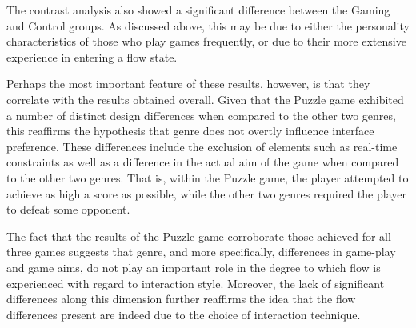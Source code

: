 The contrast analysis also showed a significant difference between the Gaming and Control groups. As discussed above, this may be due to either the personality characteristics of those who play games frequently, or due to their more extensive experience in entering a flow state.

Perhaps the most important feature of these results, however, is that they correlate with the results obtained overall. Given that the Puzzle game exhibited a number of distinct design differences when compared to the other two genres, this reaffirms the hypothesis that genre does not overtly influence interface preference. These differences include the exclusion of elements such as real-time constraints as well as a difference in the actual aim of the game when compared to the other two genres. That is, within the Puzzle game, the player attempted to achieve as high a score as possible, while the other two genres required the player to defeat some opponent. 

The fact that the results of the Puzzle game corroborate those achieved for all three games suggests that genre, and more specifically, differences in game-play and game aims, do not play an important role in the degree to which flow is experienced with regard to interaction style. Moreover, the lack of significant differences along this dimension further reaffirms the idea that the flow differences present are indeed due to the choice of interaction technique.




